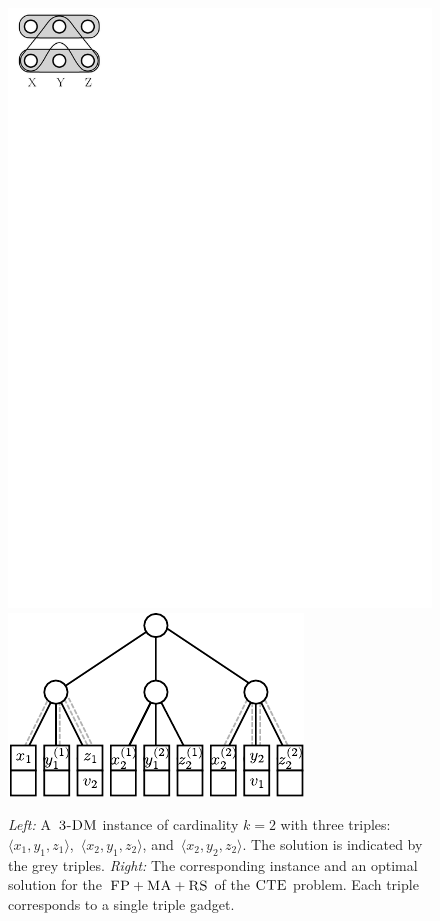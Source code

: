 \begin{figure}[t]
  \centering
\includegraphics[width = 0.21\columnwidth]{figs/static-mapping/tdm-horizontal}
\hspace{1cm}
\centering
\includegraphics[width = 0.4\columnwidth]{figs/static-mapping/np_3dm_construction}
\hfill
\caption{\textit{Left:} A~$\textsc{3-DM}$ instance of cardinality $k=2$ with three triples:
$\langle x_1, y_1, z_1 \rangle$,~$\langle x_2, y_1, z_2 \rangle$, and~$\langle x_2, y_2, z_2\rangle$. The solution is
indicated by the grey triples. \textit{Right:} The corresponding instance and an optimal solution for the~$\textsc{FP} + \textsc{MA}
+ \textsc{RS}$ of the $\textsc{CTE}$ problem. Each triple corresponds to a single triple gadget.}
\hfill
\label{fig:fprsma}
\end{figure}

